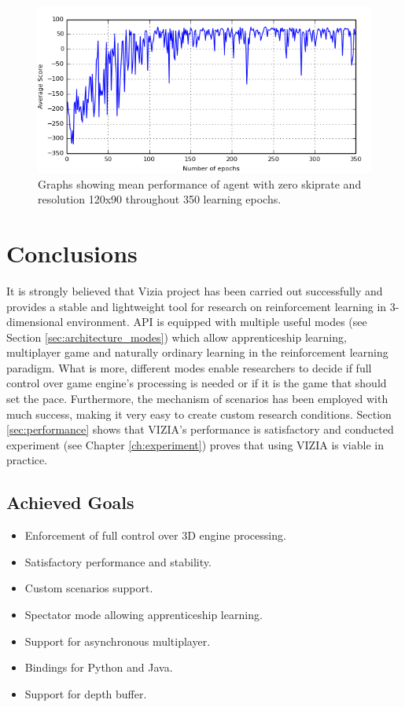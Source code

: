 \documentclass[english,bachelor,a4paper,twoside]{ppfcmthesis}
\begin{document}
	\begin{figure}
		\centering
		\includegraphics{results_skiprate0.png}
		\caption{Graphs showing mean performance of agent with zero skiprate and resolution 120x90 throughout 350 learning epochs.}\label{fig:results_skiprate0}
	\end{figure}

	
\chapter{Conclusions}\label{ch:conclusions}
	It is strongly believed that Vizia project has been carried out successfully and provides a stable and lightweight tool for research on reinforcement learning in 3-dimensional environment. API is equipped with multiple useful modes (see Section \ref{sec:architecture_modes}) which allow apprenticeship learning, multiplayer game and naturally ordinary learning in the reinforcement learning paradigm. What is more, different modes enable researchers to decide if full control over game engine's processing is needed or if it is the game that should set the pace. Furthermore, the mechanism of scenarios has been employed with much success, making it very easy to create custom research conditions. Section \ref{sec:performance} shows that VIZIA's performance is satisfactory and conducted experiment (see Chapter \ref{ch:experiment}) proves that using VIZIA is viable in practice. 

\section{Achieved Goals}
	\begin{itemize}
		\item Enforcement of full control over 3D engine processing.
		\item Satisfactory performance and stability.
		\item Custom scenarios support.
		\item Spectator mode allowing apprenticeship learning.
		\item Support for asynchronous multiplayer.
		\item Bindings for Python and Java.
		\item Support for depth buffer.
	\end{itemize}
\end{document}
